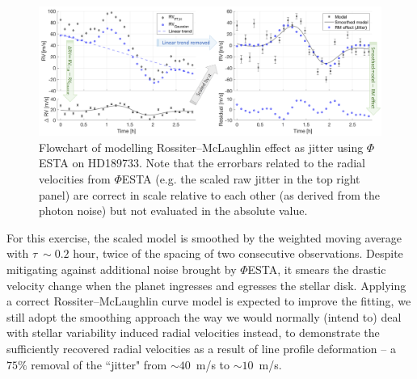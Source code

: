 \begin{figure}[tbp]
\centering
\includegraphics[width = 1.0 \linewidth]
{./Figures/Methods/HD189733.png}
\caption[HD189733: modelling Rossiter–McLaughlin effect as jitter]
		{Flowchart of modelling Rossiter–McLaughlin effect as jitter using $\mathit{\Phi}$ESTA on HD189733. Note that the errorbars related to the radial velocities from $\mathit{\Phi}$ESTA (e.g. the scaled raw jitter in the top right panel) are correct in scale relative to each other (as derived from the photon noise) but not evaluated in the absolute value.}
\label{fig:HD189733}
\end{figure} 

For this exercise, the scaled model is smoothed by the weighted moving average with $\tau~\sim0.2$ hour, twice of the spacing of two consecutive observations. Despite mitigating against additional noise brought by $\mathit{\Phi}$ESTA, it smears the drastic velocity change when the planet ingresses and egresses the stellar disk. Applying a correct Rossiter–McLaughlin curve model is expected to improve the fitting, we still adopt the smoothing approach the way we would normally (intend to) deal with stellar variability induced radial velocities instead, to demonstrate the sufficiently recovered radial velocities as a result of line profile deformation -- a $75\%$ removal of the ``jitter" from $\sim 40$~m/s to $\sim 10$~m/s. 

%
%

